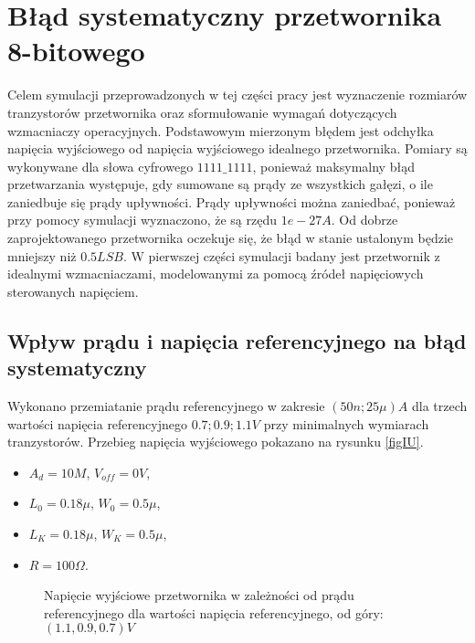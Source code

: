 \documentclass[10pt,a4paper,twoside]{report}
\theoremstyle{definition}
\theoremstyle{definition}
\theoremstyle{definition}
\theoremstyle{definition}
\theoremstyle{definition}
\begin{document}
{	\section{Błąd systematyczny przetwornika 8-bitowego}
	{ Celem symulacji przeprowadzonych w tej części pracy jest wyznaczenie rozmiarów tranzystorów przetwornika oraz sformułowanie wymagań dotyczących wzmacniaczy operacyjnych. Podstawowym mierzonym błędem jest odchyłka napięcia wyjściowego od napięcia wyjściowego idealnego przetwornika. Pomiary są wykonywane dla słowa cyfrowego $1111\_1111$, ponieważ maksymalny błąd przetwarzania występuje, gdy sumowane są prądy ze wszystkich gałęzi, o ile zaniedbuje się prądy upływności. Prądy upływności można zaniedbać, ponieważ przy pomocy symulacji wyznaczono, że są rzędu $1e-27A$. Od dobrze zaprojektowanego przetwornika oczekuje się, że błąd w stanie ustalonym będzie mniejszy niż $0.5LSB$. W pierwszej części symulacji badany jest przetwornik z idealnymi wzmacniaczami, modelowanymi za pomocą źródeł napięciowych sterowanych napięciem.}
	
	\subsection{Wpływ prądu i napięcia referencyjnego na błąd systematyczny}
	{	Wykonano przemiatanie prądu referencyjnego w zakresie $(50n; 25\mu)A$ dla trzech wartości napięcia referencyjnego ${0.7;0.9;1.1}V$ przy minimalnych wymiarach tranzystorów. Przebieg napięcia wyjściowego pokazano na rysunku \ref{figIU}.
	\begin{itemize}
		\item $A_d = 10M$, $V_{off} = 0V$,
		\item $L_0 = 0.18\mu$, $W_0 = 0.5\mu$,
		\item $L_K = 0.18\mu$, $W_K = 0.5\mu$,
		\item $R = 100 \Omega$.
	\end{itemize}
	
	\begin{figure}[!ht]
		\centering
		\caption{Napięcie wyjściowe przetwornika w zależności od prądu referencyjnego dla wartości napięcia referencyjnego, od góry: $(1.1,0.9,0.7)V$}
	\end{figure}
	
}}
\end{document}
